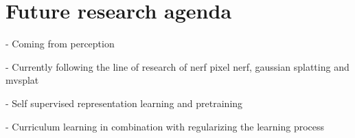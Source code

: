 \section{Future research agenda}
- Coming from perception

- Currently following the line of research of nerf pixel nerf, gaussian splatting and mvsplat

- Self supervised representation learning and pretraining

- Curriculum learning in combination with regularizing the learning process
